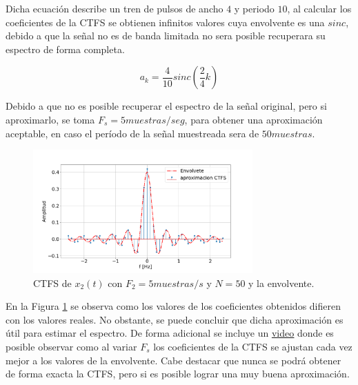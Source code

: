 \documentclass{article}
\begin{document}
    Dicha ecuación describe un tren de pulsos de ancho $4$ y periodo $10$, al calcular los coeficientes de la CTFS se obtienen
    infinitos valores cuya envolvente es una $sinc$, debido a que la señal no es de banda limitada no sera posible recuperara su espectro 
    de forma completa. 

    \begin{equation}
        a_k = \frac{4}{10} sinc \left( \frac{2}{4}k \right)
    \end{equation}

    Debido a que no es posible recuperar el espectro de la señal original, pero si aproximarlo, se toma $F_s=5 muestras/seg$, para
    obtener una aproximación aceptable, en caso el período de la señal muestreada sera de $50 muestras$.

    \begin{figure}[H]
        \centering
        \includegraphics[width=0.75\textwidth]{Img/punto_2_g_2.png}
        \caption{CTFS de $x_2(t)$ con $F_2=5 muestras/s$ y $N=50$ y la envolvente.}
        \label{fig.2gii}
    \end{figure}

    En la Figura \ref{fig.2gii} se observa como los valores de los coeficientes obtenidos difieren con los valores reales. No obstante, se puede concluir que dicha aproximación es útil para estimar el espectro. De forma adicional se incluye un \href{https://drive.google.com/open?id=10pVC59n6z_zfX6Qlm4w96l_1q3lnr2g6}{\underline{video}}
    donde es posible observar como al variar $F_s$ los coeficientes de la CTFS se ajustan cada vez mejor a los valores de la envolvente. Cabe destacar que nunca se podrá obtener de forma exacta la CTFS, pero si es posible lograr una muy buena aproximación. 
\end{document}
